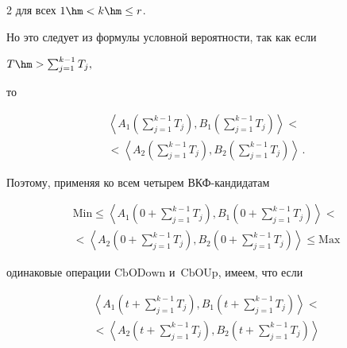 \begin{multicols}{2}
    для всех $1\hm < k\hm\leq r$.

    

    Но это следует из формулы условной вероят\-ности, так как если 

    $T\hm> \sum\nolimits_{j=1}^{k-1} T_j,$

    то 

   \begin{multline*}

    \left\langle A_1 \left( \sum\limits_{j=1}^{k-1} T_j\right), B_1\left( 

\sum\limits_{j=1}^{k-1} T_j\right) \right\rangle<{}\\

{}<

    \left\langle A_2\left( \sum\limits_{j=1}^{k-1} T_j\right), B_2\left( 

\sum\limits_{j=1}^{k-1} T_j\right)\right\rangle\,.

    \end{multline*}

        Поэтому, применяя ко всем четырем ВКФ-кан\-ди\-да\-там 

    \begin{multline*}

    \mathrm{Min} \leq \left\langle A_1\left( 0+\sum\limits_{j=1}^{k-1} T_j\right), 

B_1\left(0+\sum\limits_{j=1}^{k-1} T_j\right)\right\rangle<{}\\

    {}< \left\langle A_2\left( 0+\sum\limits_{j=1}^{k-1} T_j\right),

    B_2\left( 0+\sum\limits_{j=1}^{k-1} T_j\right)\right\rangle\leq \mathrm{Max}

    \end{multline*}

одинаковые операции $\mathrm{CbODown}$ и~$\mathrm{CbOUp}$, имеем, что если 

\begin{multline*}

\left\langle A_1\left( t+\sum\limits_{j=1}^{k-1} T_j\right), 

B_1\left(t+\sum\limits_{j=1}^{k-1} T_j\right)\right\rangle<{}\\

    {}< \left\langle A_2\left( t+\sum\limits_{j=1}^{k-1} T_j\right),

B_2\left( t+\sum\limits_{j=1}^{k-1} T_j\right)\right\rangle

\end{multline*}


\end{multicols}
